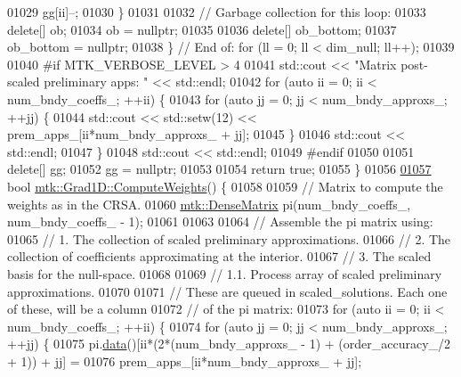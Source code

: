 \begin{DoxyCode}
{{01029       gg[ii]--;
01030     \}
01031 
01032     \textcolor{comment}{// Garbage collection for this loop:}
01033     \textcolor{keyword}{delete}[] ob;
01034     ob = \textcolor{keyword}{nullptr};
01035 
01036     \textcolor{keyword}{delete}[] ob\_bottom;
01037     ob\_bottom = \textcolor{keyword}{nullptr};
01038   \} \textcolor{comment}{// End of: for (ll = 0; ll < dim\_null; ll++);}
01039 
01040 \textcolor{preprocessor}{  #if MTK\_VERBOSE\_LEVEL > 4}
01041   std::cout << \textcolor{stringliteral}{"Matrix post-scaled preliminary apps: "} << std::endl;
01042   \textcolor{keywordflow}{for} (\textcolor{keyword}{auto} ii = 0; ii < num\_bndy\_coeffs\_; ++ii) \{
01043     \textcolor{keywordflow}{for} (\textcolor{keyword}{auto} jj = 0; jj < num\_bndy\_approxs\_; ++jj) \{
01044       std::cout << std::setw(12) << prem\_apps\_[ii*num\_bndy\_approxs\_ + jj];
01045     \}
01046     std::cout << std::endl;
01047   \}
01048   std::cout << std::endl;
01049 \textcolor{preprocessor}{  #endif}
01050 
01051   \textcolor{keyword}{delete}[] gg;
01052   gg = \textcolor{keyword}{nullptr};
01053 
01054   \textcolor{keywordflow}{return} \textcolor{keyword}{true};
01055 \}
01056 
\hypertarget{mtk__grad__1d_8cc_source_l01057}{}\hyperlink{classmtk_1_1Grad1D_a224082617751864bffca9bfe494c36d5}{01057} \textcolor{keywordtype}{bool} \hyperlink{classmtk_1_1Grad1D_a224082617751864bffca9bfe494c36d5}{mtk::Grad1D::ComputeWeights}() \{
01058 
01059   \textcolor{comment}{// Matrix to compute the weights as in the CRSA.}
01060   \hyperlink{classmtk_1_1DenseMatrix}{mtk::DenseMatrix} pi(num\_bndy\_coeffs\_, num\_bndy\_coeffs\_ - 1);
01061 
01063 
01064   \textcolor{comment}{// Assemble the pi matrix using:}
01065   \textcolor{comment}{// 1. The collection of scaled preliminary approximations.}
01066   \textcolor{comment}{// 2. The collection of coefficients approximating at the interior.}
01067   \textcolor{comment}{// 3. The scaled basis for the null-space.}
01068 
01069   \textcolor{comment}{// 1.1. Process array of scaled preliminary approximations.}
01070 
01071   \textcolor{comment}{// These are queued in scaled\_solutions. Each one of these, will be a column}
01072   \textcolor{comment}{// of the pi matrix:}
01073   \textcolor{keywordflow}{for} (\textcolor{keyword}{auto} ii = 0; ii < num\_bndy\_coeffs\_; ++ii) \{
01074     \textcolor{keywordflow}{for} (\textcolor{keyword}{auto} jj = 0; jj < num\_bndy\_approxs\_; ++jj) \{
01075       pi.\hyperlink{classmtk_1_1DenseMatrix_a0c33b8a9e01d157c61ddbdf807c25d84}{data}()[ii*(2*(num\_bndy\_approxs\_ - 1) + (order\_accuracy\_/2 + 1)) + jj] =
01076         prem\_apps\_[ii*num\_bndy\_approxs\_ + jj];
}}
\end{DoxyCode}

